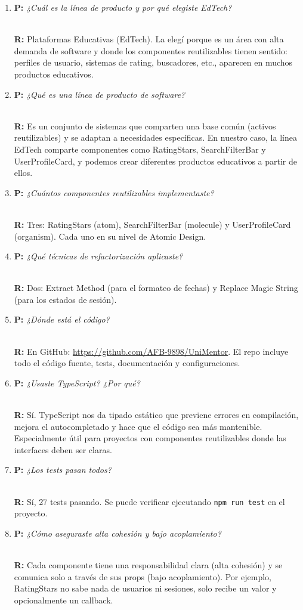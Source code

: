 \documentclass[12pt, a4paper]{article}
\newcommand{\pregunta}[1]{%
  \textbf{\textcolor{upds-blue}{P:}} \textit{#1}%
}
\newcommand{\respuesta}[1]{%
  \\[2pt]\textbf{\textcolor{upds-blue}{R:}} #1%
}
\begin{document}
\begin{enumerate}

  \item \pregunta{¿Cuál es la línea de producto y por qué elegiste EdTech?}
  \respuesta{Plataformas Educativas (EdTech). La elegí porque es un área con alta demanda de software y donde los componentes reutilizables tienen sentido: perfiles de usuario, sistemas de rating, buscadores, etc., aparecen en muchos productos educativos.}

  \item \pregunta{¿Qué es una línea de producto de software?}
  \respuesta{Es un conjunto de sistemas que comparten una base común (activos reutilizables) y se adaptan a necesidades específicas. En nuestro caso, la línea EdTech comparte componentes como RatingStars, SearchFilterBar y UserProfileCard, y podemos crear diferentes productos educativos a partir de ellos.}

  \item \pregunta{¿Cuántos componentes reutilizables implementaste?}
  \respuesta{Tres: RatingStars (atom), SearchFilterBar (molecule) y UserProfileCard (organism). Cada uno en su nivel de Atomic Design.}

  \item \pregunta{¿Qué técnicas de refactorización aplicaste?}
  \respuesta{Dos: Extract Method (para el formateo de fechas) y Replace Magic String (para los estados de sesión).}

  \item \pregunta{¿Dónde está el código?}
  \respuesta{En GitHub: \url{https://github.com/AFB-9898/UniMentor}. El repo incluye todo el código fuente, tests, documentación y configuraciones.}

  \item \pregunta{¿Usaste TypeScript? ¿Por qué?}
  \respuesta{Sí. TypeScript nos da tipado estático que previene errores en compilación, mejora el autocompletado y hace que el código sea más mantenible. Especialmente útil para proyectos con componentes reutilizables donde las interfaces deben ser claras.}

  \item \pregunta{¿Los tests pasan todos?}
  \respuesta{Sí, 27 tests pasando. Se puede verificar ejecutando \texttt{npm run test} en el proyecto.}

  \item \pregunta{¿Cómo aseguraste alta cohesión y bajo acoplamiento?}
  \respuesta{Cada componente tiene una responsabilidad clara (alta cohesión) y se comunica solo a través de sus props (bajo acoplamiento). Por ejemplo, RatingStars no sabe nada de usuarios ni sesiones, solo recibe un valor y opcionalmente un callback.}


\end{enumerate}
\end{document}
